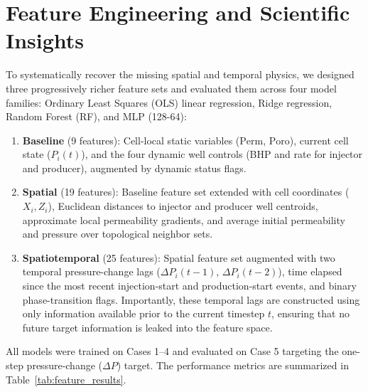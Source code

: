 \documentclass[10pt,twocolumn]{article}
\begin{document}
\section{Feature Engineering and Scientific Insights}
To systematically recover the missing spatial and temporal physics, we designed three progressively richer feature sets and evaluated them across four model families: Ordinary Least Squares (OLS) linear regression, Ridge regression, Random Forest (RF), and MLP (128-64):
\begin{enumerate}
    \item \textbf{Baseline} (9 features): Cell-local static variables ($\text{Perm}$, $\text{Poro}$), current cell state ($P_i(t)$), and the four dynamic well controls (BHP and rate for injector and producer), augmented by dynamic status flags.
    \item \textbf{Spatial} (19 features): Baseline feature set extended with cell coordinates ($X_i, Z_i$), Euclidean distances to injector and producer well centroids, approximate local permeability gradients, and average initial permeability and pressure over topological neighbor sets.
    \item \textbf{Spatiotemporal} (25 features): Spatial feature set augmented with two temporal pressure-change lags ($\Delta P_i(t-1)$, $\Delta P_i(t-2)$), time elapsed since the most recent injection-start and production-start events, and binary phase-transition flags. Importantly, these temporal lags are constructed using only information available prior to the current timestep $t$, ensuring that no future target information is leaked into the feature space.
\end{enumerate}

All models were trained on Cases 1--4 and evaluated on Case 5 targeting the one-step pressure-change ($\Delta P$) target. The performance metrics are summarized in Table~\ref{tab:feature_results}.
\end{document}
